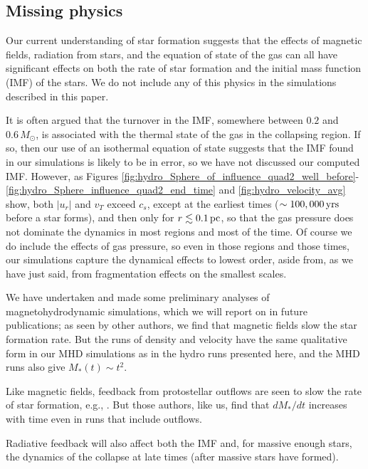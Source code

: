 \documentclass[../dissertation.tex]{subfiles}
\begin{document}
\subsection{Missing physics} \label{subsec:missing_physics}
Our current understanding of star formation suggests that the effects of magnetic 
fields, radiation from stars, and the equation 
of state of the gas can 
all have significant effects on both the rate of star formation and the initial 
mass function (IMF) of the stars. We do not include any of this physics in the simulations
described in this paper. 

It is often argued that the turnover in the IMF, somewhere between $0.2$ and
 $0.6\,M_\odot$, is associated with the thermal state of the gas in the collapsing
region. If so, then our use of an isothermal equation of state suggests that the IMF found in our simulations is likely to be in error, so we have not discussed our computed IMF. However, as Figures \ref{fig:hydro_Sphere_of_influence_quad2_well_before}-\ref{fig:hydro_Sphere_influence_quad2_end_time} and \ref{fig:hydro_velocity_avg} show, both $|u_r|$ and $v_T$ exceed $c_s$, except at the earliest times ($\sim 100,000\,\rm yrs$ before a star forms), and then only for $r\lesssim0.1\,\rm pc$, so that the gas pressure does not dominate the dynamics in most regions and most of the time. Of course we do include the effects of gas pressure, so even in those regions and those times, our simulations capture the dynamical effects to lowest order, aside from, as we have just said, from fragmentation effects on the smallest scales. 

We have undertaken and made some preliminary analyses of magnetohydrodynamic simulations, which we will report on in future publications; as seen by other authors, we find that magnetic fields slow the star formation rate. But the runs of density and velocity have the same qualitative form in our MHD simulations as in the hydro runs presented here, and the MHD runs also give $M_*(t)\sim t^2$. 

Like magnetic fields, feedback from protostellar outflows are seen to slow the rate of star formation, e.g., \citet{2010ApJ...709...27W,2015MNRAS.450.4035F}. But those authors, like us,  find that $dM_*/dt$ increases with time even in runs that include outflows. 

Radiative feedback will also affect both the IMF and, for massive enough stars, the dynamics of the collapse at late times (after massive stars have formed). 
\end{document}
